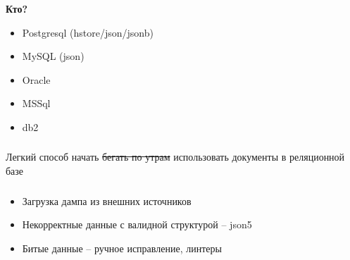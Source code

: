 \documentclass[18pt, compress, aspectratio=169]{beamer}
\begin{document}
\begin{frame}
    \frametitle{}
    \begin{center}
        \textbf{Кто?}
        \begin{itemize}[label={\MVRightarrow}]
            \item Postgresql (hstore/json/jsonb)
            \item MySQL (json)
            \item Oracle
            \item MSSql
            \item db2
        \end{itemize}
    \end{center}
\end{frame}

\fontsize{13pt}{14}\selectfont
\begin{frame}
    \frametitle{}
    \vspace{2em}
    \centering
    \begin{minipage}{32em}
        Легкий способ начать \sout{бегать по утрам} использовать документы в реляционной базе
    \end{minipage}
\end{frame}
\fontsize{17pt}{18}\selectfont




\begin{frame}
    \frametitle{}
    \begin{center}
        \begin{itemize}[label={\MVRightarrow}]
            \item Загрузка дампа из внешних источников
            \item Некорректные данные с валидной структурой -- json5
            \item Битые данные -- ручное исправление, линтеры
        \end{itemize}
    \end{center}
\end{frame}
\end{document}
